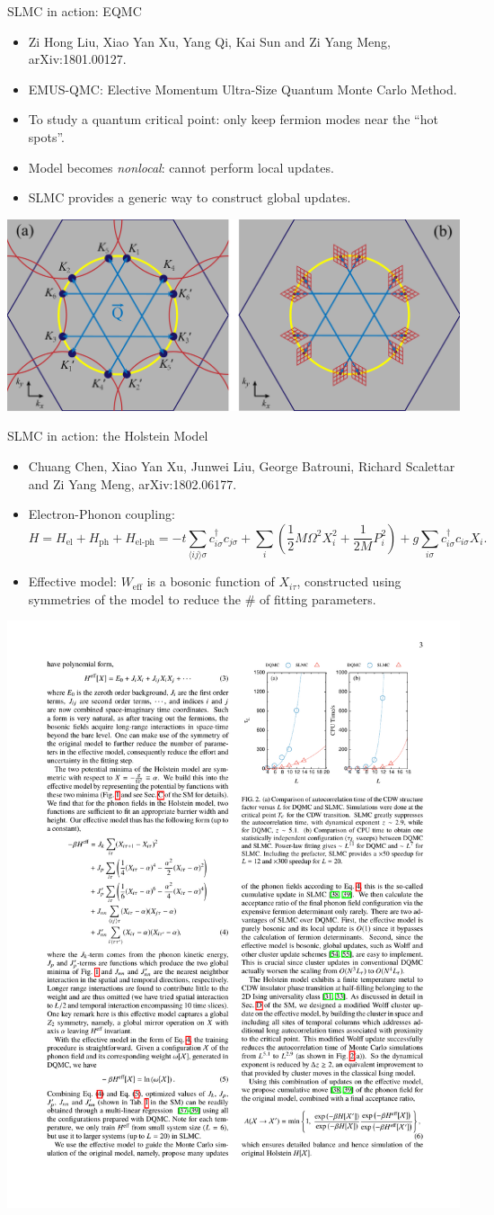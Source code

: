 \documentclass[xcolor=table, 10pt, aspectratio=169]{beamer}
\begin{document}
\begin{frame}{SLMC in action: EQMC}
\begin{itemize}
	\item Zi Hong Liu, Xiao Yan Xu, Yang Qi, Kai Sun and Zi Yang Meng, arXiv:1801.00127.
	\item EMUS-QMC: Elective Momentum Ultra-Size Quantum Monte Carlo Method.
	\item To study a quantum critical point: only keep fermion modes near the ``hot spots''.
	\item Model becomes \emph{nonlocal}: cannot perform local updates.
	\item SLMC provides a generic way to construct global updates.
\end{itemize}
\begin{center}
	\includegraphics[width=.8\textwidth]{../eqmc/kmeshtri}
\end{center}
\end{frame}

\begin{frame}{SLMC in action: the Holstein Model}
	\begin{itemize}
		\item Chuang Chen, Xiao Yan Xu, Junwei Liu, George Batrouni, Richard Scalettar and Zi Yang Meng, arXiv:1802.06177.
		\item Electron-Phonon coupling:
		\[H=H_{\text{el}}+H_{\text{ph}}+H_{\text{el-ph}}
		=-t\sum_{\langle ij\rangle\sigma}c_{i\sigma}^\dagger c_{j\sigma}
		+\sum_i\left(\frac12M\Omega^2X_i^2+\frac1{2M}P_i^2\right)
		+g\sum_{i\sigma}c_{i\sigma}^\dagger c_{i\sigma}X_i.\]
		\item Effective model: $W_{\text{eff}}$ is a bosonic function of $X_{i\tau}$, constructed using symmetries of the model to reduce the \# of fitting parameters.
	\end{itemize}
	\begin{center}
		\includegraphics[width=.35\textwidth]{holstein}
	\end{center}
\end{frame}
\end{document}
